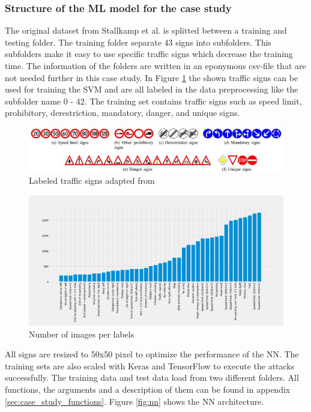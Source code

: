 \subsubsection*{Structure of the ML model for the case study}

The original dataset from Stallkamp et al. \cite{DBLP:conf/ijcnn/StallkampSSI11} is splitted between a training and testing folder. The training folder separate 43 signs into subfolders. This subfolders make it easy to use specific traffic signs which decrease the training time. The information of the folders are written in an eponymous csv-file that are not needed further in this case study. In Figure \ref{fig:traffic_signs} the shown traffic signs can be used for training the SVM and are all labeled in the data preprocessing like the subfolder name 0 - 42. The training set contains traffic signs such as speed limit, prohibitory, derestriction, mandatory, danger, and unique signs.

\begin{figure}[h!]
  \centering
  \includegraphics[width=12cm]{pictures/traffic_signs.jpg}
  \caption{Labeled traffic signs adapted from \cite{DBLP:conf/ijcnn/StallkampSSI11}}
  \label{fig:traffic_signs}
\end{figure}

\begin{figure}[h!]
  \centering
  \includegraphics[width=15cm]{pictures/num_of_images.png}
  \caption{Number of images per labels}
  \label{fig:num_of_images}
\end{figure}

All signs are resized to 50x50 pixel to optimize the performance of the NN. The training sets are also scaled with Keras and TensorFlow to execute the attacks successfully. The training data and test data load from two different folders. All functions, the arguments and a description of them can be found in appendix \ref{sec:case_study_functions}. Figure \ref{fig:nn} shows the NN architecture.

